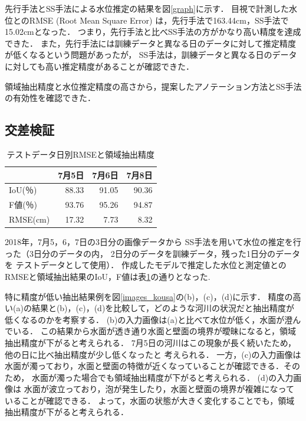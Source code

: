 \documentclass[a4j,twocolumn,10pt]{jarticle}
\begin{document}
先行手法とSS手法による水位推定の結果を図\ref{graph}に示す．
目視で計測した水位とのRMSE (Root Mean Square Error) は，先行手法で163.44cm，SS手法で15.02cmとなった．
つまり，先行手法と比べSS手法の方がかなり高い精度を達成できた．
また，先行手法には訓練データと異なる日のデータに対して推定精度が低くなるという問題があったが，
SS手法は，訓練データと異なる日のデータに対しても高い推定精度があることが確認できた．

領域抽出精度と水位推定精度の高さから，提案したアノテーション方法とSS手法の有効性を確認できた．

\subsection{交差検証}

\begin{table}[b]
  \centering

  \begin{tabular}{l|rrr}
     &7月5日&7月6日&7月8日 \\ \hline 
   IoU(％)&88.33&91.05&90.36\\ \hline  
   F値(％)&93.76&95.26&94.87\\ \hline  
   RMSE(cm)&17.32& 7.73&8.32\\ \hline  
  \end{tabular}
  \vspace{-3mm}
  \caption{テストデータ日別RMSEと領域抽出精度} 
  \label{kousa}
\end{table}

2018年，7月5，6，7日の3日分の画像データから
SS手法を用いて水位の推定を行った（3日分のデータの内，
2日分のデータを訓練データ，残った1日分のデータを
テストデータとして使用）．
作成したモデルで推定した水位と測定値とのRMSEと領域抽出結果のIoU，F値は表\ref{kousa}の通りとなった. 

特に精度が低い抽出結果例を図\ref{images_kousa}の(b)，(c)，(d)に示す．
精度の高い(a)の結果と(b)，(c)，(d)を比較して，どのような河川の状況だと抽出精度が低くなるのかを考察する．
(b)の入力画像は(a)と比べて水位が低く，水面が澄んでいる．
この結果から水面が透き通り水面と壁面の境界が曖昧になると，領域抽出精度が下がると考えられる．
7月5日の河川はこの現象が長く続いたため，他の日に比べ抽出精度が少し低くなったと
考えられる．
一方，(c)の入力画像は水面が濁っており，水面と壁面の特徴が近くなっていることが確認できる．そのため，
水面が濁った場合でも領域抽出精度が下がると考えられる．
(d)の入力画像は
水面が波立っており，泡が発生したり，水面と壁面の境界が複雑になっていることが確認できる．
よって，水面の状態が大きく変化することでも，領域抽出精度が下がると考えられる．
\end{document}
